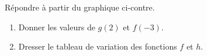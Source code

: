 
\begin{exercice}\label{exoSeconde-0072}


    \begin{multicols}{2}
        \begin{center}
            
        \end{center}

        \columnbreak

        Répondre à partir du graphique ci-contre.
        \begin{enumerate}
            \item
                Donner les valeurs de \( g(2)\) et \( f(-3)\).
            \item
                Dresser le tableau de variation des fonctions \( f\) et \( h\).
        \end{enumerate}

    \end{multicols}

\end{exercice}
